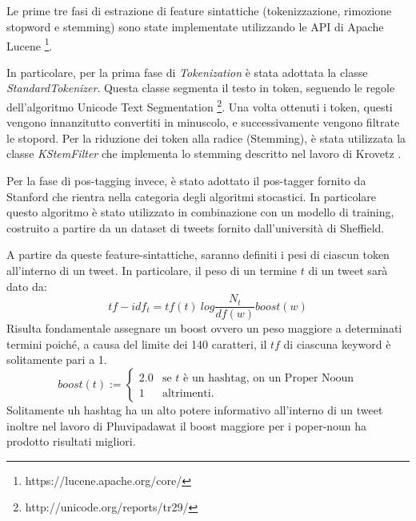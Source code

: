 \subsection*{ }
Le prime tre fasi di estrazione di feature sintattiche (tokenizzazione, rimozione stopword e stemming) sono state implementate utilizzando le API di Apache Lucene \footnote{https://lucene.apache.org/core/}.

In particolare, per la prima fase di \emph{Tokenization}  è stata adottata la classe \emph{StandardTokenizer}. Questa classe segmenta il testo in token, seguendo le regole dell'algoritmo Unicode Text Segmentation \footnote{http://unicode.org/reports/tr29/}. 
Una volta ottenuti i token, questi vengono innanzitutto convertiti in minuscolo, e successivamente vengono filtrate le stopord.
Per la riduzione dei token alla radice (Stemming), è stata utilizzata la classe \emph{KStemFilter} che implementa lo stemming descritto nel lavoro di Krovetz \cite{Krovetz:1993:VMI:160688.160718}.

Per la fase di pos-tagging invece, è stato adottato il pos-tagger fornito da Stanford \cite{Toutanova:2000:EKS:1117794.1117802} che rientra nella categoria degli algoritmi stocastici. In particolare questo algoritmo è stato utilizzato in combinazione con un modello di training, costruito a partire da un dataset di tweets \cite{GateModelTagger} fornito dall'università di Sheffield.



A partire da queste feature-sintattiche, saranno definiti i pesi di ciascun token all'interno di un tweet.
In particolare, il peso di un termine $t$ di un tweet sarà dato da:
\begin{equation}
tf-idf_t=tf(t)\ log\frac{N_t}{df(w)}boost(w)
\end{equation}
 Risulta fondamentale assegnare un boost ovvero un peso maggiore a determinati termini poiché, a causa del limite dei 140 caratteri, il $tf$ di ciascuna keyword è solitamente pari a 1. 
\begin{equation*}
boost(t):=\begin{cases}
2.0 & \text{se $t$ è un hashtag, on un Proper Nooun}\\
1& \text{altrimenti.}
\end{cases}
\end{equation*}
Solitamente uh hashtag ha un alto potere informativo all'interno di un tweet inoltre nel lavoro di  Phuvipadawat \cite{Phuvipadawat:2010:BND:1913791.1913911}  il boost maggiore per i poper-noun ha prodotto risultati migliori.





